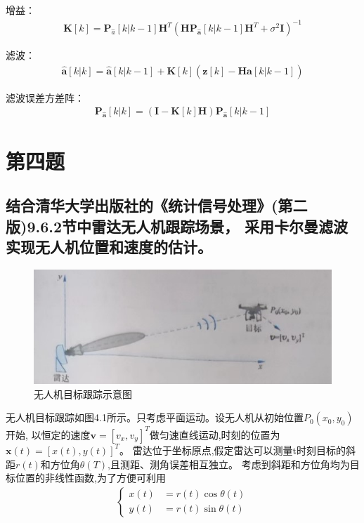 \documentclass[fontset=windows]{article}
\numberwithin{figure}{section}
\begin{document}
增益：
\begin{align*}
    \mathbf{K}[k]=\mathbf{P}_{\hat{a}}[k|k-1]\mathbf{H}^T
    (\mathbf{H P}_{\hat{\mathbf{a}}}[k|k-1]\mathbf{H}^T+\sigma^2\mathbf{I})^{-1}
\end{align*}

滤波：
\begin{align*}
    \hat{\mathbf{a}}[k|k]=\hat{\mathbf{a}}[k|k-1]+\mathbf{K}[k]
    (\mathbf{z}[k]-\mathbf{H} \hat{\mathbf{a}}[k|k-1])
\end{align*}

滤波误差方差阵：
\begin{align*}
    \mathbf{P}_{\hat{\mathbf{a}}}[k|k]=
    (\mathbf{I}-\mathbf{K}[k]\mathbf{H})\mathbf{P}_{\hat{\mathbf{a}}}[k|k-1]
\end{align*}

\section{第四题}
\subsection*{结合清华大学出版社的《统计信号处理》(第二版)9.6.2节中雷达无人机跟踪场景，
    采用卡尔曼滤波实现无人机位置和速度的估计。}

\begin{figure}[H]
    \centering
    \includegraphics[scale=0.8]{4_1.jpg}
    \caption{无人机目标跟踪示意图}
    \label{4.1}
\end{figure}

无人机目标跟踪如图4.1所示。只考虑平面运动。设无人机从初始位置\(P_0(x_0,y_0)\)开始,
以恒定的速度\(\mathbf{v}=[v_x,v_y]^T\)做匀速直线运动,时刻的位置为\(\mathbf{x}(t)=[x(t),y(t)]^T\)。
雷达位于坐标原点,假定雷达可以测量t时刻目标的斜距\(r(t)\)和方位角\(\theta(T)\),且测距、测角误差相互独立。
考虑到斜距和方位角均为目标位置的非线性函数,为了方便可利用
\begin{align}
    \left\{
    \begin{matrix}
        x(t) & =r(t)\cos\theta(t) \\
        y(t) & =r(t)\sin\theta(t)
    \end{matrix}
    \right.
\end{align}
\end{document}
